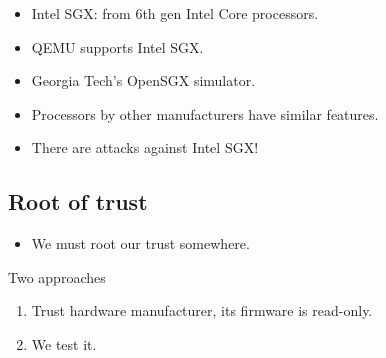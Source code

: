 \begin{frame}
  \begin{example}[Implementations]
    \begin{itemize}
      \item Intel SGX: from 6th gen Intel Core processors.
      \item QEMU supports Intel SGX.
      \item Georgia Tech's OpenSGX simulator.
    \end{itemize}
  \end{example}

  \pause

  \begin{remark}
    \begin{itemize}
      \item Processors by other manufacturers have similar features.
    \end{itemize}
  \end{remark}
\end{frame}

\begin{frame}
  \begin{remark}
    \begin{itemize}
      \item There are attacks against Intel SGX!
    \end{itemize}
  \end{remark}
\end{frame}

\subsection{Root of trust}

\begin{frame}
  \begin{remark}
    \begin{itemize}
      \item We must root our trust somewhere.
    \end{itemize}
  \end{remark}

  \pause

  \begin{block}{Two approaches}
    \begin{enumerate}
      \item Trust hardware manufacturer, its firmware is read-only.
      \item We test it.
    \end{enumerate}
  \end{block}
\end{frame}

